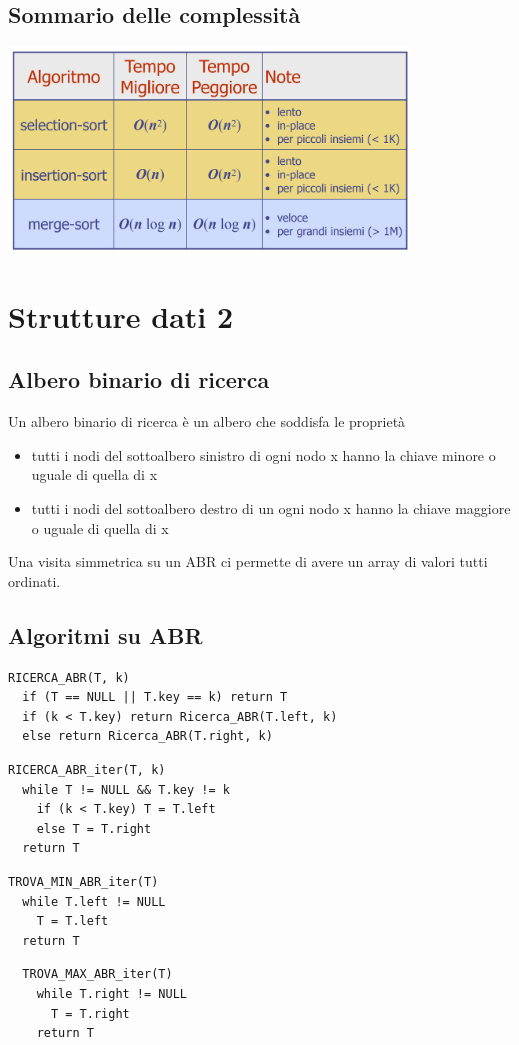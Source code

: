 \documentclass{article}
\begin{document}
\subsection{Sommario delle complessità}
\begin{center}
  \includegraphics[width=0.8\textwidth]{costo_algo}
\end{center}
\pagebreak

\section{Strutture dati 2}
\subsection{Albero binario di ricerca}
Un albero binario di ricerca è un albero che soddisfa le proprietà
\begin{itemize}
  \item tutti i nodi del sottoalbero sinistro di ogni nodo x hanno la chiave minore o uguale di quella di x
  \item tutti i nodi del sottoalbero destro di un ogni nodo x hanno la chiave maggiore o uguale di quella di x
\end{itemize}
Una visita simmetrica su un ABR ci permette di avere un array di valori tutti ordinati.
\subsection*{Algoritmi su ABR}
\begin{lstlisting}
RICERCA_ABR(T, k)
  if (T == NULL || T.key == k) return T
  if (k < T.key) return Ricerca_ABR(T.left, k)
  else return Ricerca_ABR(T.right, k)
\end{lstlisting}
\begin{lstlisting}
RICERCA_ABR_iter(T, k)
  while T != NULL && T.key != k
    if (k < T.key) T = T.left
    else T = T.right
  return T
\end{lstlisting}
\begin{lstlisting}
TROVA_MIN_ABR_iter(T)
  while T.left != NULL
    T = T.left
  return T
\end{lstlisting}
\begin{lstlisting}
  TROVA_MAX_ABR_iter(T)
    while T.right != NULL
      T = T.right
    return T
\end{lstlisting}
\end{document}
